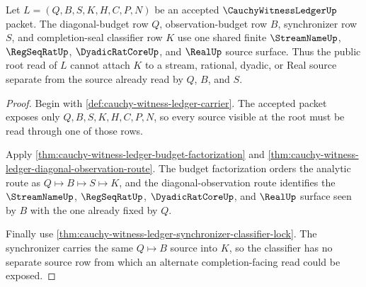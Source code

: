 \begin{theorem}
\label{thm:cauchy-witness-ledger-root-source-lock}
Let $L=(Q,B,S,K,H,C,P,N)$ be an accepted $\CauchyWitnessLedgerUp$ packet. The diagonal-budget row $Q$, observation-budget row $B$, synchronizer row $S$, and completion-seal classifier row $K$ use one shared finite $\StreamNameUp$, $\RegSeqRatUp$, $\DyadicRatCoreUp$, and $\RealUp$ source surface. Thus the public root read of $L$ cannot attach $K$ to a stream, rational, dyadic, or Real source separate from the source already read by $Q$, $B$, and $S$.
\end{theorem}
\begin{proof}
Begin with \autoref{def:cauchy-witness-ledger-carrier}. The accepted packet exposes only $Q,B,S,K,H,C,P,N$, so every source visible at the root must be read through one of those rows.

Apply \autoref{thm:cauchy-witness-ledger-budget-factorization} and \autoref{thm:cauchy-witness-ledger-diagonal-observation-route}. The budget factorization orders the analytic route as $Q \longmapsto B \longmapsto S \longmapsto K$, and the diagonal-observation route identifies the $\StreamNameUp$, $\RegSeqRatUp$, $\DyadicRatCoreUp$, and $\RealUp$ surface seen by $B$ with the one already fixed by $Q$.

Finally use \autoref{thm:cauchy-witness-ledger-synchronizer-classifier-lock}. The synchronizer carries the same $Q \longmapsto B$ source into $K$, so the classifier has no separate source row from which an alternate completion-facing read could be exposed.
\end{proof}

